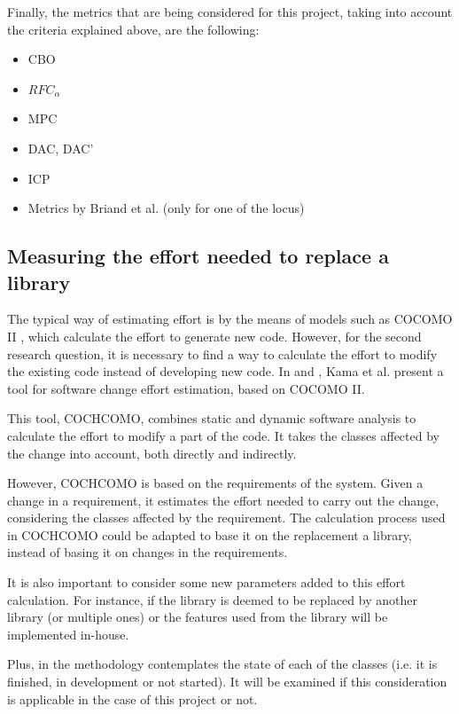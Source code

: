 Finally, the metrics that are being considered for this project, taking into account the criteria explained above, are the following:

\begin{itemize} %
    \item CBO
    \item $RFC_\alpha$
    \item MPC
    \item DAC, DAC'
    \item ICP
    \item Metrics by Briand et al. (only for one of the locus)
\end{itemize}

\subsection{Measuring the effort needed to replace a library}
The typical way of estimating effort is by the means of models such as COCOMO II \cite{sharma2011analysis}, which calculate the effort to generate new code. However, for the second research question, it is necessary to find a way to calculate the effort to modify the existing code instead of developing new code. In \cite{kama2014cochcomo} and \cite{asl2013change}, Kama et al. present a tool for software change effort estimation, based on COCOMO II.

This tool, COCHCOMO, combines static and dynamic software analysis to calculate the effort to modify a part of the code. It takes the classes affected by the change into account, both directly and indirectly.

However, COCHCOMO is based on the requirements of the system. Given a change in a requirement, it estimates the effort needed to carry out the change, considering the classes affected by the requirement. The calculation process used in COCHCOMO could be adapted to base it on the replacement a library, instead of basing it on changes in the requirements.

It is also important to consider some new parameters added to this effort calculation. For instance, if the library is deemed to be replaced by another library (or multiple ones) or the features used from the library will be implemented in-house.

Plus, in \cite{kama2014cochcomo} the methodology contemplates the state of each of the classes (i.e. it is finished, in development or not started). It will be examined if this consideration is applicable in the case of this project or not.

